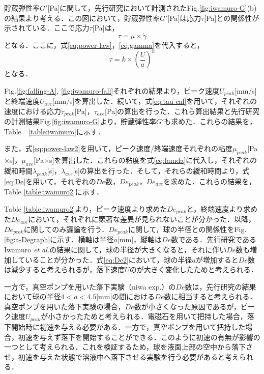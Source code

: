 貯蔵弾性率$G'$[Pa]に関して，先行研究において計測されたFig.\ref{fig:iwamuro-G}(b)の結果より考える．この図において，貯蔵弾性率$G'$[Pa]は応力$\tau$[Pa]との関係性が示されている．ここで応力$\tau$[Pa]は，
\begin{equation}
    \tau = \mu \times \dot{\gamma}
    \label{eq:tau}
\end{equation}
となる．ここに，式\ref{eq:power-law}，\ref{eq:gamma}を代入すると，
\begin{equation}
    \tau = k \times \left(\frac{U}{a}\right)^n
    \label{eq:tau-cal}
\end{equation}
となる．

Fig.\ref{fig:falling-A}, \ref{fig:iwamuro-fall}それぞれの結果より，ピーク速度$U_{peak}$[mm/s]と終端速度$U_{ave}$[mm/s]を算出した．続いて，式\ref{eq:tau-cal}を用いて，それぞれの速度における応力$\tau_{peak}$[Pa]，$\tau_{ave}$[Pa]の算出を行った．これら算出結果と先行研究の計測結果Fig.\ref{fig:iwamuro-G}より，貯蔵弾性率$G'$も求めた．これらの結果を，Table　\ref{table:iwamuro}に示す．

また，式\ref{eq:power-law2}を用いて，ピーク速度/終端速度それぞれの粘度$\mu_{peak}$[Pa$\times$s]，$\mu_{ave}$[Pa$\times$s]を算出した．これらの粘度を式\ref{eq:lamda}に代入し，それぞれの緩和時間$\lambda_{peak}$[s]，$\lambda_{ave}$[s]の算出を行った．そして，それらの緩和時間より，式\ref{eq:De}を用いて，それぞれの$De$数，$De_{peak}$，$De_{ave}$を求めた．これらの結果を，Table \ref{table:iwamuro2}に示す．

Table \ref{table:iwamuro2}より，ピーク速度より求めた$De_{peak}$と，終端速度より求めた$De_{ave}$において，それぞれに顕著な差異が見られないことが分かった．以降，$De_{peak}$に関してのみ議論を行う．$De_{peak}$に関して，球の半径との関係性をFig.\ref{fig:a-Degraph}に示す．横軸は半径$a$[mm]，縦軸は$De$数である．先行研究であるIwamuro \textit{et al.}\cite{ref:8}の結果に関して，球の半径が大きくなると，それに伴い$De$数も増加していることが分かった．式\ref{eq:De2}において，球の半径$a$が増加すると$De$数は減少すると考えられるが，落下速度$U$のが大きく変化したためと考えられる．

一方で，真空ポンプを用いた落下実験（niwa exp.）の$De$数は，先行研究の結果において球の半径$4<a<4.5$[mm]の間における$De$数に相当すると考えられる．真空ポンプを用いた落下実験の場合，$De$数が小さくなった原因であるが，ピーク速度$U_{peak}$が小さかったためと考えられる．電磁石を用いて把持した場合，落下開始時に初速を与える必要がある．一方で，真空ポンプを用いて把持した場合，初速を与えず落下を開始することができる．このように初速の有無が影響の一つとして考えられる．これを検証するため，球を液面上部の空中から落下させ，初速を与えた状態で溶液中へ落下させる実験を行う必要があると考えられる．

